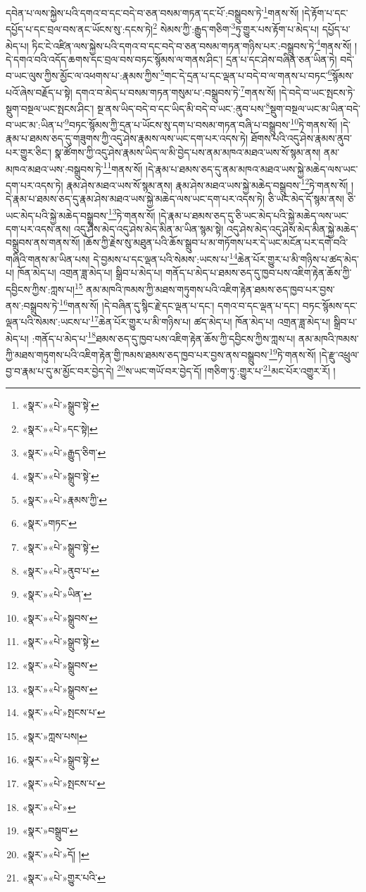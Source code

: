 དབེན་པ་ལས་སྐྱེས་པའི་དགའ་བ་དང་བདེ་བ་ཅན་བསམ་གཏན་དང་པོ་:བསྒྲུབས་ཏེ་\footnote{«སྣར་»«པེ་»སྒྲུབ་སྟེ་}གནས་སོ། །དེ་རྟོག་པ་དང་དཔྱོད་པ་དང་བྲལ་བས་ནང་ཡོངས་སུ་:དངས་ཏེ།\footnote{«སྣར་»«པེ་»དང་སྟེ།} སེམས་ཀྱི་:རྒྱུད་གཅིག་\footnote{«སྣར་»«པེ་»རྒྱུད་ཅིག་}ཏུ་གྱུར་པས་རྟོག་པ་མེད་པ། དཔྱོད་པ་མེད་པ། ཏིང་ངེ་འཛིན་ལས་སྐྱེས་པའི་དགའ་བ་དང་བདེ་བ་ཅན་བསམ་གཏན་གཉིས་པར་:བསྒྲུབས་ཏེ་\footnote{«སྣར་»«པེ་»སྒྲུབ་སྟེ་}གནས་སོ། །དེ་དགའ་བའི་འདོད་ཆགས་དང་བྲལ་བས་བཏང་སྙོམས་ལ་གནས་ཤིང་། དྲན་པ་དང་ཤེས་བཞིན་ཅན་ཡིན་ཏེ། བདེ་བ་ཡང་ལུས་ཀྱིས་མྱོང་ལ་འཕགས་པ་:རྣམས་ཀྱིས་\footnote{«སྣར་»«པེ་»རྣམས་ཀྱི་}གང་དེ་དྲན་པ་དང་ལྡན་པ་བདེ་བ་ལ་གནས་པ་བཏང་\footnote{«སྣར་»གཏང་}སྙོམས་པའོ་ཞེས་བརྗོད་པ་སྟེ། དགའ་བ་མེད་པ་བསམ་གཏན་གསུམ་པ་:བསྒྲུབས་ཏེ་\footnote{«སྣར་»«པེ་»སྒྲུབ་སྟེ་}གནས་སོ། །དེ་བདེ་བ་ཡང་སྤངས་ཏེ་སྡུག་བསྔལ་ཡང་སྤངས་ཤིང་། སྔ་ནས་ཡིད་བདེ་བ་དང་ཡིད་མི་བདེ་བ་ཡང་:ནུབ་པས་\footnote{«སྣར་»«པེ་»ནུབ་པ་}སྡུག་བསྔལ་ཡང་མ་ཡིན་བདེ་བ་ཡང་མ་:ཡིན་པ་\footnote{«སྣར་»«པེ་»ཡིན་}བཏང་སྙོམས་ཀྱི་དྲན་པ་ཡོངས་སུ་དག་པ་བསམ་གཏན་བཞི་པ་བསྒྲུབས་\footnote{«སྣར་»«པེ་»སྒྲུབས་}ཏེ་གནས་སོ། །དེ་རྣམ་པ་ཐམས་ཅད་དུ་གཟུགས་ཀྱི་འདུ་ཤེས་རྣམས་ལས་ཡང་དག་པར་འདས་ཏེ། ཐོགས་པའི་འདུ་ཤེས་རྣམས་ནུབ་པར་གྱུར་ཅིང་། སྣ་ཚོགས་ཀྱི་འདུ་ཤེས་རྣམས་ཡིད་ལ་མི་བྱེད་པས་ནམ་མཁའ་མཐའ་ཡས་སོ་སྙམ་ནས། ནམ་མཁའ་མཐའ་ཡས་:བསྒྲུབས་ཏེ་\footnote{«སྣར་»«པེ་»སྒྲུབ་སྟེ་}གནས་སོ། །དེ་རྣམ་པ་ཐམས་ཅད་དུ་ནམ་མཁའ་མཐའ་ཡས་སྐྱེ་མཆེད་ལས་ཡང་དག་པར་འདས་ཏེ། རྣམ་ཤེས་མཐའ་ཡས་སོ་སྙམ་ནས། རྣམ་ཤེས་མཐའ་ཡས་སྐྱེ་མཆེད་བསྒྲུབས་\footnote{«སྣར་»«པེ་»སྒྲུབས་}ཏེ་གནས་སོ། །དེ་རྣམ་པ་ཐམས་ཅད་དུ་རྣམ་ཤེས་མཐའ་ཡས་སྐྱེ་མཆེད་ལས་ཡང་དག་པར་འདས་ཏེ། ཅི་ཡང་མེད་དོ་སྙམ་ནས། ཅི་ཡང་མེད་པའི་སྐྱེ་མཆེད་བསྒྲུབས་\footnote{«སྣར་»«པེ་»སྒྲུབས་}ཏེ་གནས་སོ། །དེ་རྣམ་པ་ཐམས་ཅད་དུ་ཅི་ཡང་མེད་པའི་སྐྱེ་མཆེད་ལས་ཡང་དག་པར་འདས་ནས། འདུ་ཤེས་མེད་འདུ་ཤེས་མེད་མིན་མ་ཡིན་སྙམ་སྟེ། འདུ་ཤེས་མེད་འདུ་ཤེས་མེད་མིན་སྐྱེ་མཆེད་བསྒྲུབས་ནས་གནས་སོ། །ཆོས་ཀྱི་རྗེས་སུ་མཐུན་པའི་ཆོས་སྒྲུབ་པ་མ་གཏོགས་པར་དེ་ཡང་མངོན་པར་དགེ་བའི་གཞིའི་གནས་མ་ཡིན་པས། དེ་བྱམས་པ་དང་ལྡན་པའི་སེམས་:ཡངས་པ་\footnote{«སྣར་»«པེ་»སྤངས་པ་}ཆེན་པོར་གྱུར་པ་མི་གཉིས་པ་ཚད་མེད་པ། ཁོན་མེད་པ། འགྲན་ཟླ་མེད་པ། སྒྲིབ་པ་མེད་པ། གནོད་པ་མེད་པ་ཐམས་ཅད་དུ་ཁྱབ་པས་འཇིག་རྟེན་ཆོས་ཀྱི་དབྱིངས་ཀྱིས་:ཀླས་པ།\footnote{«སྣར་»ཀླས་པས།} ནམ་མཁའི་ཁམས་ཀྱི་མཐས་གཏུགས་པའི་འཇིག་རྟེན་ཐམས་ཅད་ཁྱབ་པར་བྱས་ནས་:བསྒྲུབས་ཏེ་\footnote{«སྣར་»«པེ་»སྒྲུབ་སྟེ་}གནས་སོ། །དེ་བཞིན་དུ་སྙིང་རྗེ་དང་ལྡན་པ་དང་། དགའ་བ་དང་ལྡན་པ་དང་། བཏང་སྙོམས་དང་ལྡན་པའི་སེམས་:ཡངས་པ་\footnote{«སྣར་»«པེ་»སྤངས་པ་}ཆེན་པོར་གྱུར་པ་མི་གཉིས་པ། ཚད་མེད་པ། ཁོན་མེད་པ། འགྲན་ཟླ་མེད་པ། སྒྲིབ་པ་མེད་པ། :གནོད་པ་མེད་པ་\footnote{«སྣར་»«པེ་»}ཐམས་ཅད་དུ་ཁྱབ་པས་འཇིག་རྟེན་ཆོས་ཀྱི་དབྱིངས་ཀྱིས་ཀླས་པ། ནམ་མཁའི་ཁམས་ཀྱི་མཐས་གཏུགས་པའི་འཇིག་རྟེན་གྱི་ཁམས་ཐམས་ཅད་ཁྱབ་པར་བྱས་ནས་བསྒྲུབས་\footnote{«སྣར་»བསྒྲུབ་}ཏེ་གནས་སོ། །དེ་རྫུ་འཕྲུལ་བྱ་བ་རྣམ་པ་དུ་མ་མྱོང་བར་བྱེད་དེ། \footnote{«སྣར་»«པེ་»དོ། ། }ས་ཡང་གཡོ་བར་བྱེད་དོ། །གཅིག་ཏུ་:གྱུར་པ་\footnote{«སྣར་»«པེ་»གྱུར་པའི་}མང་པོར་འགྱུར་རོ། །
